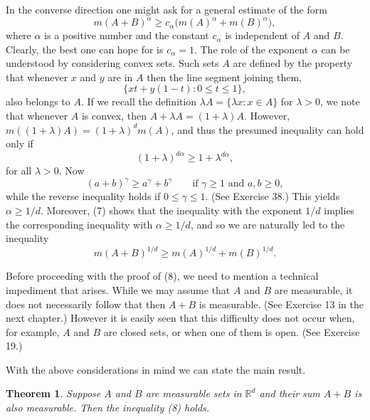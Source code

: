 \documentclass[11pt,openany]{book}
\newtheorem{theorem}{Theorem}[section]
\begin{document}
In the converse direction one might ask for a general estimate of the form
\[
 m(A+B)^\alpha\ge c_\alpha\bigl(m(A)^\alpha+m(B)^\alpha\bigr),
\]
where $\alpha$ is a positive number and the constant $c_\alpha$ is independent of $A$ and $B$. Clearly, the best one can hope for is $c_\alpha=1$. The role of the exponent $\alpha$ can be understood by considering convex sets. Such sets $A$ are defined by the property that whenever $x$ and $y$ are in $A$ then the line segment joining them,
\[
 \{xt+y(1-t):0\le t\le1\},
\]
also belongs to $A$. If we recall the definition $\lambda A=\{\lambda x:x\in A\}$ for $\lambda>0$, we note that whenever $A$ is convex, then $A+\lambda A=(1+\lambda)A$. However, $m((1+\lambda)A)=(1+\lambda)^dm(A)$, and thus the presumed inequality can hold only if
\[
 (1+\lambda)^{d\alpha}\ge1+\lambda^{d\alpha},
\]
for all $\lambda>0$. Now
\begin{equation}
 (a+b)^\gamma\ge a^\gamma+b^\gamma
 \qquad\text{if }\gamma\ge1\text{ and }a,b\ge0,
 \tag{7}
\end{equation}
while the reverse inequality holds if $0\le\gamma\le1$. (See Exercise 38.) This yields $\alpha\ge1/d$. Moreover, (7) shows that the inequality with the exponent $1/d$ implies the corresponding inequality with $\alpha\ge1/d$, and so we are naturally led to the inequality
\begin{equation}
 m(A+B)^{1/d}\ge m(A)^{1/d}+m(B)^{1/d}.
 \tag{8}
\end{equation}

Before proceeding with the proof of (8), we need to mention a technical impediment that arises. While we may assume that $A$ and $B$ are measurable, it does not necessarily follow that then $A+B$ is measurable. (See Exercise 13 in the next chapter.) However it is easily seen that this difficulty does not occur when, for example, $A$ and $B$ are closed sets, or when one of them is open. (See Exercise 19.)

With the above considerations in mind we can state the main result.

\begin{theorem}
Suppose $A$ and $B$ are measurable sets in $\mathbb{R}^d$ and their sum $A+B$ is also measurable. Then the inequality (8) holds.
\end{theorem}
\end{document}
